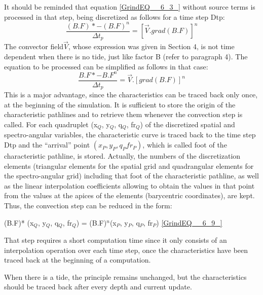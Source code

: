  It should be reminded that equation \eqref{GrindEQ__6_3_} without source terms is processed in that step, being discretized as follows for a time step Dtp:
\begin{equation} \label{GrindEQ__6_7_}
\frac{(B.F)*-(B.F)^{n} }{\Delta t_{p} } =\left[\vec{V}.grad(B.F)\right]^{n}
\end{equation}
The convector field$\vec{V}$, whose expression was given in Section 4, is not time dependent when there is no tide, just like factor B (refer to paragraph 4). The equation to be processed can be simplified as follows in that case:
\begin{equation} \label{GrindEQ__6_8_}
\frac{B.F*-B.F^{n} }{\Delta t_{p} } =\vec{V}.\left[grad(B.F)\right]^{n}
\end{equation}
This is a major advantage, since the characteristics can be traced back only once, at the beginning of the simulation. It is sufficient to store the origin of the characteristic pathlines and to retrieve them whenever the convection step is called. For each quadruplet (x${}_{Q}$, y${}_{Q}$, q${}_{Q}$, fr${}_{Q}$) of the discretized spatial and spectro-angular variables, the characteristic curve is traced back to the time step Dtp and the ``arrival'' point $(x_{P}, y_{P}, q_{P} fr_{P})$, which is called foot of the characteristic pathline, is stored. Actually, the numbers of the discretization elements (triangular elements for the spatial grid and quadrangular elements for the spectro-angular grid) including that foot of the characteristic pathline, as well as the linear interpolation coefficients allowing to obtain the values in that point from the values at the apices of the elements (barycentric coordinates), are kept. Thus, the convection step can be reduced in the form:

(B.F)* (x${}_{Q}$, y${}_{Q}$, q${}_{Q}$, fr${}_{Q}$) = (B.F)${}^{n}$(x${}_{P}$, y${}_{P}$, q${}_{P}$, fr${}_{P}$) \eqref{GrindEQ__6_9_}

That step requires a short computation time since it only consists of an interpolation operation over each time step, once the characteristics have been traced back at the beginning of a computation.

 When there is a tide, the principle remains unchanged, but the characteristics should be traced back after every depth and current update.

